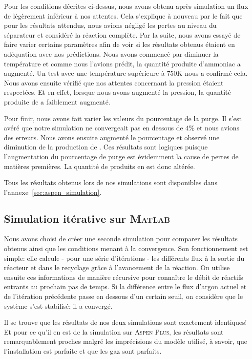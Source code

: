 Pour les conditions décrites ci-dessus, 
nous avons obtenu après simulation un flux de  légèrement inférieur à nos attentes. 
Cela s'explique à nouveau par le fait que pour les résultats attendus, 
nous avions négligé les pertes au niveau du séparateur et considéré la réaction complète.
Par la suite, nous avons essayé de faire varier certains paramètres afin 
de voir si les résultats obtenus étaient en adéquation avec nos prédictions. 
Nous avons commencé par diminuer la température et comme nous l'avions prédit, 
la quantité produite d'ammoniac a augmenté. 
Un test avec une température supérieure à $750\si{\kelvin}$ nous a confirmé cela. 
Nous avons ensuite vérifié que nos attentes concernant la pression étaient respectées. 
Et en effet, lorsque nous avons augmenté la pression, 
la quantité produite de  a faiblement augmenté.

Pour finir, nous avons fait varier les valeurs du pourcentage de la purge.
Il s'est avéré que notre simulation ne convergeait pas en dessous de $4\%$ 
et nous avions des erreurs.
Nous avons ensuite augmenté le pourcentage 
et observé une diminution de la production de . 
Ces résultats sont logiques puisque l'augmentation du pourcentage 
de purge est évidemment la cause de pertes de matières premières. 
La quantité de produits en est donc altérée.

Tous les résultats obtenus lors de nos simulations 
sont disponibles dans l'annexe~\ref{sec:aspen_simulation}.

\subsection{Simulation itérative sur \textsc{Matlab}}

Nous avons choisi de créer une seconde simulation
pour comparer les résultats obtenus ainsi que 
les conditions menant à la convergence.
Son fonctionnement est simple:
elle calcule - pour une série d'itérations - 
les différents flux à la sortie du réacteur 
et dans le recyclage grâce à l'avancement de
la réaction. On utilise ensuite ces informations 
de manière récursive pour connaître le débit de 
réactifs entrants au prochain pas de temps. Si 
la différence entre le flux d'argon actuel et 
de l'itération précédente passe en dessous d'un 
certain seuil, on considère que le système s'est 
stabilisé: il a convergé.

Il se trouve que les résultats de nos deux simulations
sont exactement identiques! Et pour ce qu'il en est
de la simulation sur \textsc{Aspen Plus}, les résultats sont
remarquablement proches malgré les imprécisions du modèle
utilisé, à savoir, que l'installation
est parfaite et que les gaz sont parfaits.

